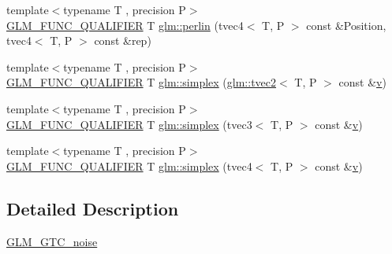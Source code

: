 \begin{DoxyCompactItemize}
\item 
{\footnotesize template$<$typename T , precision P$>$ }\\\mbox{\hyperlink{setup_8hpp_a33fdea6f91c5f834105f7415e2a64407}{G\+L\+M\+\_\+\+F\+U\+N\+C\+\_\+\+Q\+U\+A\+L\+I\+F\+I\+ER}} T \mbox{\hyperlink{namespaceglm_aac7a6a7b23c4852eb1024f5b9564142f}{glm\+::perlin}} (tvec4$<$ T, P $>$ const \&Position, tvec4$<$ T, P $>$ const \&rep)
\item 
{\footnotesize template$<$typename T , precision P$>$ }\\\mbox{\hyperlink{setup_8hpp_a33fdea6f91c5f834105f7415e2a64407}{G\+L\+M\+\_\+\+F\+U\+N\+C\+\_\+\+Q\+U\+A\+L\+I\+F\+I\+ER}} T \mbox{\hyperlink{namespaceglm_afdd43ecc519f98c7550e8850c030f1a8}{glm\+::simplex}} (\mbox{\hyperlink{structglm_1_1tvec2}{glm\+::tvec2}}$<$ T, P $>$ const \&\mbox{\hyperlink{glad_8h_a14cfbe2fc2234f5504618905b69d1e06}{v}})
\item 
{\footnotesize template$<$typename T , precision P$>$ }\\\mbox{\hyperlink{setup_8hpp_a33fdea6f91c5f834105f7415e2a64407}{G\+L\+M\+\_\+\+F\+U\+N\+C\+\_\+\+Q\+U\+A\+L\+I\+F\+I\+ER}} T \mbox{\hyperlink{namespaceglm_ad251ced23dfd0c991b7e06b5a398dfe5}{glm\+::simplex}} (tvec3$<$ T, P $>$ const \&\mbox{\hyperlink{glad_8h_a14cfbe2fc2234f5504618905b69d1e06}{v}})
\item 
{\footnotesize template$<$typename T , precision P$>$ }\\\mbox{\hyperlink{setup_8hpp_a33fdea6f91c5f834105f7415e2a64407}{G\+L\+M\+\_\+\+F\+U\+N\+C\+\_\+\+Q\+U\+A\+L\+I\+F\+I\+ER}} T \mbox{\hyperlink{namespaceglm_a302e8f4466cd88ebd9581e67c8368254}{glm\+::simplex}} (tvec4$<$ T, P $>$ const \&\mbox{\hyperlink{glad_8h_a14cfbe2fc2234f5504618905b69d1e06}{v}})
\end{DoxyCompactItemize}


\subsection{Detailed Description}
\mbox{\hyperlink{group__gtc__noise}{G\+L\+M\+\_\+\+G\+T\+C\+\_\+noise}} 